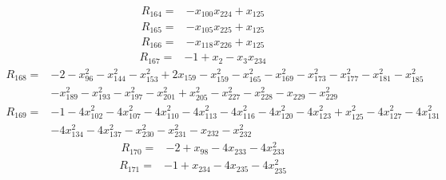 \begin{align*}
 R_{164}={}&-x_{100}x_{224} +x_{125}
\end{align*}
\begin{align*}
 R_{165}={}&-x_{105}x_{225} +x_{125}
\end{align*}
\begin{align*}
 R_{166}={}&-x_{118}x_{226} +x_{125}
\end{align*}
\begin{align*}
 R_{167}={}&-1 +x_{2} -x_{3}x_{234}
\end{align*}
\begin{align*}
 R_{168}={}&-2 -x_{96}^{2} -x_{144}^{2} -x_{153}^{2} +2x_{159} -x_{159}^{2} -x_{165}^{2} -x_{169}^{2} -x_{173}^{2} -x_{177}^{2} -x_{181}^{2} -x_{185}^{2}\\
 &-x_{189}^{2} -x_{193}^{2} -x_{197}^{2} -x_{201}^{2} +x_{205}^{2} -x_{227}^{2} -x_{228}^{2} -x_{229} -x_{229}^{2}
\end{align*}
\begin{align*}
 R_{169}={}&-1 -4x_{102}^{2} -4x_{107}^{2} -4x_{110}^{2} -4x_{113}^{2} -4x_{116}^{2} -4x_{120}^{2} -4x_{123}^{2} +x_{125}^{2} -4x_{127}^{2} -4x_{131}^{2}\\
 &-4x_{134}^{2} -4x_{137}^{2} -x_{230}^{2} -x_{231}^{2} -x_{232} -x_{232}^{2}
\end{align*}
\begin{align*}
 R_{170}={}&-2 +x_{98} -4x_{233} -4x_{233}^{2}
\end{align*}
\begin{align*}
 R_{171}={}&-1 +x_{234} -4x_{235} -4x_{235}^{2}
\end{align*}
